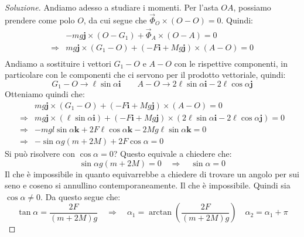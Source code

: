 \documentclass[11pt,a4paper,twoside]{article}
\theoremstyle{definition}
\newenvironment{sol}
	{\renewcommand\qedsymbol{$\blacksquare$}\begin{proof}[Soluzione]}
	{\end{proof}}
\begin{document}
\begin{sol}
	Andiamo adesso a studiare i momenti. Per l'asta $OA$, possiamo prendere come polo $O$, da cui segue che $\vec \Phi_O \times (O-O)=0$. Quindi:
	\begin{align*}
		& -mg \mathbf j \times (O-G_1) + \vec \Phi_A \times (O-A) =0\\
		\Rightarrow & mg \mathbf j \times (G_1-O) + (-F\mathbf i + Mg\mathbf  j)\times (A-O) = 0\\
	\end{align*}
	Andiamo a sostituire i vettori $G_1-O$ e $A-O$ con le rispettive componenti, in particolare con le componenti che ci servono per il prodotto vettoriale, quindi:
	\[ G_1-O \to \ell \sin \alpha \mathbf i \qquad A-O \to 2\ell \sin \alpha \mathbf i - 2 \ell \cos \alpha \mathbf j \]
	Otteniamo quindi che:
	\begin{align*}
		& mg \mathbf j \times (G_1-O) + (-F\mathbf i + Mg\mathbf  j)\times (A-O) = 0\\
		\Rightarrow & mg \mathbf j \times (\ell \sin \alpha \mathbf i) + (-F \mathbf i +Mg \mathbf j)\times (2\ell \sin \alpha \mathbf i - 2 \ell \cos \alpha \mathbf j) = 0\\
		\Rightarrow & -mgl \sin \alpha \mathbf k + 2F \ell\cos \alpha \mathbf k - 2 Mg\ell \sin \alpha \mathbf k = 0\\
		\Rightarrow & -\sin \alpha g(m + 2M) + 2F\cos \alpha = 0
	\end{align*}
	Si può risolvere con $\cos\alpha = 0$? Questo equivale a chiedere che:
	\[ \sin \alpha g(m + 2M) = 0 \quad \Rightarrow \quad \sin \alpha =0 \]
	Il che è impossibile in quanto equivarrebbe a chiedere di trovare un angolo per sui seno e coseno si annullino contemporaneamente. Il che è impossibile.
	Quindi sia $\cos\alpha \neq 0$. Da questo segue che:
	\[ \tan \alpha = \frac{2F}{(m+2M)g} \quad \Rightarrow \quad \alpha_1 = \arctan \left( \frac{2F}{(m+2M)g} \right)\quad \alpha_2 = \alpha_1 + \pi \]


\end{sol}
\end{document}

